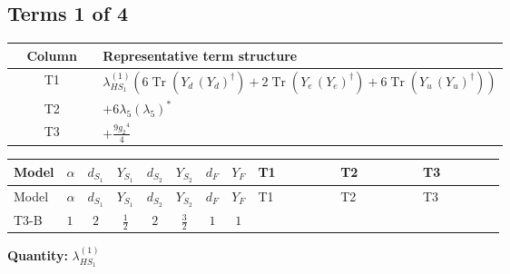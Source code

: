 \documentclass[8pt]{article}
\begin{document}
\begin{landscape}
\subsection*{Terms 1 of 4}
\begin{center}
\begin{tabular}{@{}c >{\raggedright\arraybackslash}p{0.82\linewidth}@{}}
\toprule
Column & Representative term structure \\
\midrule
T1 & \(\displaystyle {\lambda_{HS_1}^{(1)}} (6 \operatorname{Tr}\!\left({Y_d}\,\left({Y_d}\right)^{\dagger}\right)+2 \operatorname{Tr}\!\left({Y_e}\,\left({Y_e}\right)^{\dagger}\right)+6 \operatorname{Tr}\!\left({Y_u}\,\left({Y_u}\right)^{\dagger}\right))\) \\
\midrule
T2 & \(\displaystyle +6 {\lambda_5} \left({\lambda_5}\right)^{*}\) \\
\midrule
T3 & \(\displaystyle +\frac{9 {g_2}^4}{4}\) \\
\midrule
\bottomrule
\end{tabular}
\end{center}
\smallskip
\tiny
\begin{longtable}{@{}llcccccc >{\raggedright\arraybackslash}p{0.21\linewidth} >{\raggedright\arraybackslash}p{0.21\linewidth} >{\raggedright\arraybackslash}p{0.21\linewidth}@{}}
\toprule
Model & $\alpha$ & $d_{S_1}$ & $Y_{S_1}$ & $d_{S_2}$ & $Y_{S_2}$ & $d_F$ & $Y_F$ & T1 & T2 & T3 \\
\midrule
\endfirsthead
\toprule
Model & $\alpha$ & $d_{S_1}$ & $Y_{S_1}$ & $d_{S_2}$ & $Y_{S_2}$ & $d_F$ & $Y_F$ & T1 & T2 & T3 \\
\midrule
\endhead
T3-B & $1$ & $2$ & $\frac{1}{2}$ & $2$ & $\frac{3}{2}$ & $1$ & $1$ & \scriptsize\adjustbox{max width=\linewidth}{$\begin{gathered} {\lambda_{HS_1}^{(1)}} (6 \operatorname{Tr}\!\left({Y_d}\,\left({Y_d}\right)^{\dagger}\right)+2 \operatorname{Tr}\!\left({Y_e}\,\left({Y_e}\right)^{\dagger}\right)+6 \operatorname{Tr}\!\left({Y_u}\,\left({Y_u}\right)^{\dagger}\right))\end{gathered}$} & \scriptsize\adjustbox{max width=\linewidth}{$\begin{gathered} +6 {\lambda_5} \left({\lambda_5}\right)^{*}\end{gathered}$} & \scriptsize\adjustbox{max width=\linewidth}{$\begin{gathered} +\frac{9 {g_2}^4}{4}\end{gathered}$} \\
\midrule
\bottomrule
\end{longtable}
\clearpage
\noindent\textbf{Quantity: }$\lambda_{HS_1}^{(1)}$\par\smallskip

\end{landscape}
\end{document}
